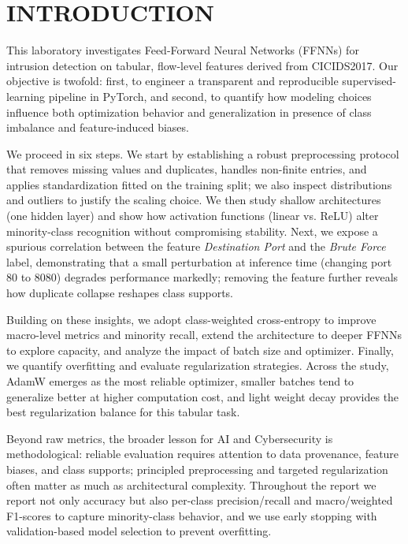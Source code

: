 
\section{INTRODUCTION} \label{sec:introduction}

    This laboratory investigates Feed-Forward Neural Networks (FFNNs) for intrusion detection on tabular, flow-level features derived from CICIDS2017. 
    Our objective is twofold: first, to engineer a transparent and reproducible supervised-learning pipeline in PyTorch, and second, to quantify how modeling choices influence both optimization behavior and generalization in presence of class imbalance and feature-induced biases.

    We proceed in six steps. We start by establishing a robust preprocessing protocol that removes missing values and duplicates, handles non-finite entries, and applies standardization fitted on the training split; we also inspect distributions and outliers to justify the scaling choice. 
    We then study shallow architectures (one hidden layer) and show how activation functions (linear vs. ReLU) alter minority-class recognition without compromising stability. 
    Next, we expose a spurious correlation between the feature \emph{Destination Port} and the \emph{Brute Force} label, demonstrating that a small perturbation at inference time (changing port 80 to 8080) degrades performance markedly; removing the feature further reveals how duplicate collapse reshapes class supports.

    Building on these insights, we adopt class-weighted cross-entropy to improve macro-level metrics and minority recall, extend the architecture to deeper FFNNs to explore capacity, and analyze the impact of batch size and optimizer. 
    Finally, we quantify overfitting and evaluate regularization strategies. 
    Across the study, AdamW emerges as the most reliable optimizer, smaller batches tend to generalize better at higher computation cost, and light weight decay provides the best regularization balance for this tabular task.

    Beyond raw metrics, the broader lesson for AI and Cybersecurity is methodological: reliable evaluation requires attention to data provenance, feature biases, and class supports; principled preprocessing and targeted regularization often matter as much as architectural complexity. 
    Throughout the report we report not only accuracy but also per-class precision/recall and macro/weighted F1-scores to capture minority-class behavior, and we use early stopping with validation-based model selection to prevent overfitting.
